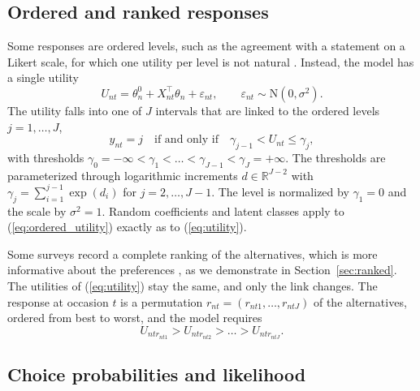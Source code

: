 \documentclass[article,shortnames]{jss}
\begin{document}
\subsection{Ordered and ranked responses} \label{sec:model:ordered_ranked}

Some responses are ordered levels, such as the agreement with a statement on a
Likert scale, for which one utility per level is not natural
\citep[Section~7.4]{Train2009}. Instead, the model has a single utility
%
\begin{equation}
  \label{eq:ordered_utility}
  U_{nt} = \theta_n^0 + X_{nt}^\top \theta_n + \varepsilon_{nt}, \qquad
  \varepsilon_{nt} \sim \mathrm{N}(0, \sigma^2).
\end{equation}
%
The utility falls into one of $J$ intervals that are linked to the ordered
levels $j = 1, \dots, J$,
%
\begin{equation}
  \label{eq:ordered_link}
  y_{nt} = j \quad \text{if and only if} \quad \gamma_{j - 1} < U_{nt} \leq
  \gamma_{j},
\end{equation}
%
with thresholds $\gamma_0 = -\infty < \gamma_1 < \dots < \gamma_{J - 1} <
\gamma_J = +\infty$. The thresholds are parameterized through logarithmic
increments $d \in \mathbb{R}^{J - 2}$ with $\gamma_j = \sum_{i = 1}^{j - 1}
\exp(d_i)$ for $j = 2, \dots, J - 1$. The level is normalized by $\gamma_1 =
0$ and the scale by $\sigma^2 = 1$. Random coefficients and latent classes apply
to (\ref{eq:ordered_utility}) exactly as to (\ref{eq:utility}).

Some surveys record a complete ranking of the alternatives, which is more
informative about the preferences \citep[Section~7.3]{Train2009}, as we
demonstrate in Section~\ref{sec:ranked}. The utilities of
(\ref{eq:utility}) stay the same, and only the link changes. The response
at occasion $t$ is a permutation $r_{nt} = (r_{nt1}, \dots, r_{ntJ})$ of the
alternatives, ordered from best to worst, and the model requires
%
\begin{equation}
  \label{eq:ranked_link}
  U_{nt r_{nt1}} > U_{nt r_{nt2}} > \dots > U_{nt r_{ntJ}}.
\end{equation}

\subsection{Choice probabilities and likelihood} \label{sec:model:probabilities}
\end{document}
